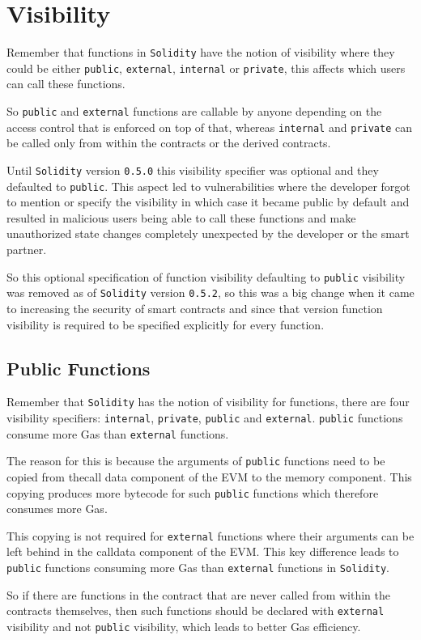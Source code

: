 \section{Visibility}\label{visibility}

Remember that functions in \texttt{Solidity} have the notion of
visibility where they could be either \texttt{public},
\texttt{external}, \texttt{internal} or \texttt{private}, this affects
which users can call these functions.

So \texttt{public} and \texttt{external} functions are callable by
anyone depending on the access control that is enforced on top of that,
whereas \texttt{internal} and \texttt{private} can be called only from
within the contracts or the derived contracts.

Until \texttt{Solidity} version \texttt{0.5.0} this visibility specifier
was optional and they defaulted to \texttt{public}. This aspect led to
vulnerabilities where the developer forgot to mention or specify the
visibility in which case it became public by default and resulted in
malicious users being able to call these functions and make unauthorized
state changes completely unexpected by the developer or the smart
partner.

So this optional specification of function visibility defaulting to
\texttt{public} visibility was removed as of \texttt{Solidity} version
\texttt{0.5.2}, so this was a big change when it came to increasing the
security of smart contracts and since that version function visibility
is required to be specified explicitly for every function.

\subsection{Public Functions}\label{public-functions}

Remember that \texttt{Solidity} has the notion of visibility for
functions, there are four visibility specifiers: \texttt{internal},
\texttt{private}, \texttt{public} and \texttt{external}. \texttt{public}
functions consume more Gas than \texttt{external} functions.

The reason for this is because the arguments of \texttt{public}
functions need to be copied from thecall data component of the EVM to
the memory component. This copying produces more bytecode for such
\texttt{public} functions which therefore consumes more Gas.

This copying is not required for \texttt{external} functions where their
arguments can be left behind in the calldata component of the EVM. This
key difference leads to \texttt{public} functions consuming more Gas
than \texttt{external} functions in \texttt{Solidity}.

So if there are functions in the contract that are never called from
within the contracts themselves, then such functions should be declared
with \texttt{external} visibility and not \texttt{public} visibility,
which leads to better Gas efficiency.
